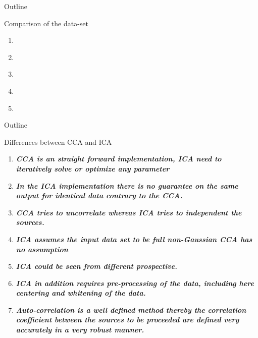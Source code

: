 \documentclass[t,12pt,english
\ifx\beamermode\undefined\else,\beamermode\fi
]{beamer}
\begin{document}
    
\begin{frame}{Outline}

\begin{block}{\footnotesize{Comparison of the data-set}}\tiny{}
\begin{enumerate} 
\vspace{0.05cm}
     \item \tiny{\textbf{\textit{}}}
     \item \tiny{\textbf{\textit{}}}
     \item \tiny{\textbf{\textit{}}}
     \item \tiny{\textbf{\textit{}}}
     \item \tiny{\textbf{\textit{}}} 

     
\end{enumerate}
\end{block}

     
   
\end{frame} 
    
\begin{frame}{Outline}


\begin{block}{\footnotesize{Differences between CCA and ICA}}\tiny{}
\begin{enumerate} 
\vspace{0.05cm}
     \item \tiny{\textbf{\textit{CCA is an straight forward implementation, ICA need to iteratively solve or optimize any parameter}}} 
     \item \tiny{\textbf{\textit{In the ICA implementation there is no guarantee on the same output for identical data contrary to the CCA.}}} 
     \item \tiny{\textbf{\textit{CCA tries to uncorrelate  whereas ICA tries to independent the sources.}}} 
     \item \tiny{\textbf{\textit{ICA assumes the input data set to be full non-Gaussian CCA has no assumption}}} 
     \item \tiny{\textbf{\textit{ICA could be seen from different prospective.}}} 
     \item \tiny{\textbf{\textit{ICA in addition requires pre-processing  of the data, including here centering and whitening of the data.}}} 
     \item \tiny{\textbf{\textit{Auto-correlation is a well defined method thereby the correlation coefficient between the sources to be proceeded are defined very accurately in a very robust manner.}}} 

     
\end{enumerate}
\end{block}
     
   
\end{frame} 
    
\end{document}
